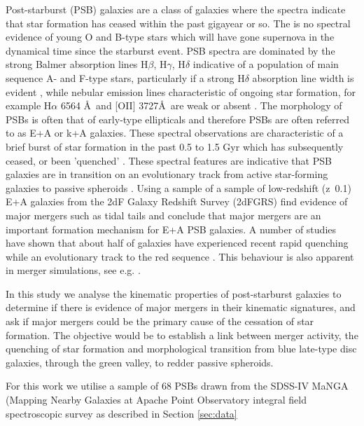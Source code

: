 Post-starburst (PSB) galaxies are a class of galaxies where the spectra indicate that star formation has ceased within the past gigayear or so. The is no spectral evidence of young O and B-type stars which will have gone supernova in the dynamical time since the starburst event. PSB spectra are dominated by the strong Balmer absorption lines H$\beta$, H$\gamma$, H$\delta$ indicative of a population of main sequence A- and F-type stars, particularly if a strong  H$\delta$ absorption line width is evident \citep{1997A&A...325.1025P}, while nebular emission lines characteristic of ongoing star formation, for example H$\alpha$ 6564 \AA\ and [OII] 3727\AA\, are weak or absent \citep{2001ApJ...547L..17B,2003PASJ...55..771G,2004MNRAS.355..713B,2005MNRAS.357..937G,2018MNRAS.477.1708P}. The morphology of PSBs is often that of early-type ellipticals and therefore PSBs are often referred to as E+A or k+A galaxies. These spectral observations are characteristic of a brief burst of star formation in the past 0.5 to 1.5 Gyr which has subsequently ceased, or been 'quenched' \citep{1983ApJ...270....7D,1987MNRAS.229..423C,1997A&A...325.1025P}. These spectral features are indicative that PSB galaxies are in transition on an evolutionary track from active star-forming galaxies to passive spheroids \citep{2004MNRAS.355..713B,2012MNRAS.420..672S,2013MNRAS.429.2212M}. Using a sample of a sample of low-redshift (z~0.1) E+A galaxies from the 2dF Galaxy Redshift Survey (2dFGRS) \citet{2004MNRAS.355..713B} find evidence of major mergers such as tidal tails and conclude that major mergers are an important formation mechanism for E+A PSB galaxies. A number of studies have shown that about half of galaxies have experienced recent rapid quenching while an evolutionary track to the red sequence \citep{Martin_2007,10.1111/j.1365-2966.2009.14537.x,2015MNRAS.450..435S}. This behaviour is also apparent in merger simulations, see e.g. \cite{2019MNRAS.484.2447D}.

In this study we analyse the kinematic properties of post-starburst galaxies to determine if there is evidence of major mergers in their kinematic signatures, and ask if major mergers could be the primary cause of the cessation of star formation. The objective would be to establish a link between merger activity, the quenching of star formation and morphological transition from blue late-type disc galaxies, through the green valley, to redder passive spheroids.

For this work we utilise a sample of 68 PSBs drawn from the SDSS-IV MaNGA (Mapping Nearby Galaxies at Apache Point Observatory integral field spectroscopic survey  as described in Section \ref{sec:data}

